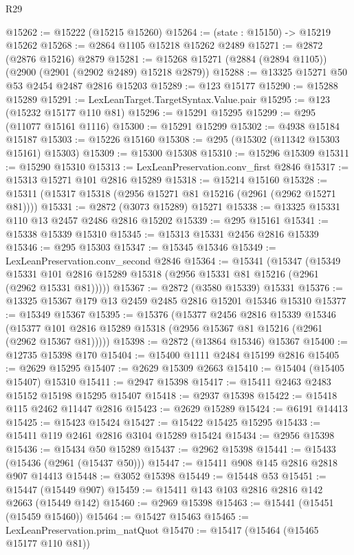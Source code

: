 \begin{lexlean}{R29}
\begin{coremodule}
@15262 := @15222 (@15215 @15260)
@15264 := (state : @15150) -> @15219 @15262
@15268 := @2864 @1105 @15218 @15262 @2489
@15271 := @2872 (@2876 @15216) @2879
@15281 := @15268 @15271 (@2884 (@2894 @1105)) (@2900 (@2901 (@2902 @2489) @15218 @2879))
@15288 := @13325 @15271 @50 @53 @2454 @2487 @2816 @15203
@15289 := @123 @15177
@15290 := @15288 @15289
@15291 := LexLeanTarget.TargetSyntax.Value.pair
@15295 := @123 (@15232 @15177 @110 @81)
@15296 := @15291 @15295
@15299 := @295 (@11077 @15161 @1116)
@15300 := @15291 @15299
@15302 := @4938 @15184 @15187
@15303 := @15226 @15160
@15308 := @295 (@15302 (@11342 @15303 @15161) @15303)
@15309 := @15300 @15308
@15310 := @15296 @15309
@15311 := @15290 @15310
@15313 := LexLeanPreservation.conv_first @2846
@15317 := @15313 @15271 @101 @2816 @15289
@15318 := @15214 @15160
@15328 := @15311 (@15317 @15318 (@2956 @15271 @81 @15216 (@2961 (@2962 @15271 @81))))
@15331 := @2872 (@3073 @15289) @15271
@15338 := @13325 @15331 @110 @13 @2457 @2486 @2816 @15202
@15339 := @295 @15161
@15341 := @15338 @15339 @15310
@15345 := @15313 @15331 @2456 @2816 @15339
@15346 := @295 @15303
@15347 := @15345 @15346
@15349 := LexLeanPreservation.conv_second @2846
@15364 := @15341
    (@15347
      (@15349 @15331 @101 @2816 @15289 @15318 (@2956 @15331 @81 @15216 (@2961 (@2962 @15331 @81)))))
@15367 := @2872 (@3580 @15339) @15331
@15376 := @13325 @15367 @179 @13 @2459 @2485 @2816 @15201 @15346 @15310
@15377 := @15349 @15367
@15395 := @15376
    (@15377
      @2456
      @2816
      @15339
      @15346
      (@15377 @101 @2816 @15289 @15318 (@2956 @15367 @81 @15216 (@2961 (@2962 @15367 @81)))))
@15398 := @2872 (@13864 @15346) @15367
@15400 := @12735 @15398 @170
@15404 := @15400 @1111 @2484 @15199 @2816
@15405 := @2629 @15295
@15407 := @2629 @15309 @2663
@15410 := @15404 (@15405 @15407) @15310
@15411 := @2947 @15398
@15417 := @15411 @2463 @2483 @15152 @15198 @15295 @15407
@15418 := @2937 @15398
@15422 := @15418 @115 @2462 @11447 @2816
@15423 := @2629 @15289
@15424 := @6191 @14413
@15425 := @15423 @15424
@15427 := @15422 @15425 @15295
@15433 := @15411 @119 @2461 @2816 @3104 @15289 @15424
@15434 := @2956 @15398
@15436 := @15434 @50 @15289
@15437 := @2962 @15398
@15441 := @15433 (@15436 (@2961 (@15437 @50)))
@15447 := @15411 @908 @145 @2816 @2818 @907 @14413
@15448 := @3052 @15398
@15449 := @15448 @53
@15451 := @15447 (@15449 @907)
@15459 := @15411 @143 @103 @2816 @2816 @142 @2663 (@15449 @142)
@15460 := @2969 @15398
@15463 := @15441 (@15451 (@15459 @15460))
@15464 := @15427 @15463
@15465 := LexLeanPreservation.prim_natQuot
@15470 := @15417 (@15464 (@15465 @15177 @110 @81))

\end{coremodule}
\end{lexlean}
